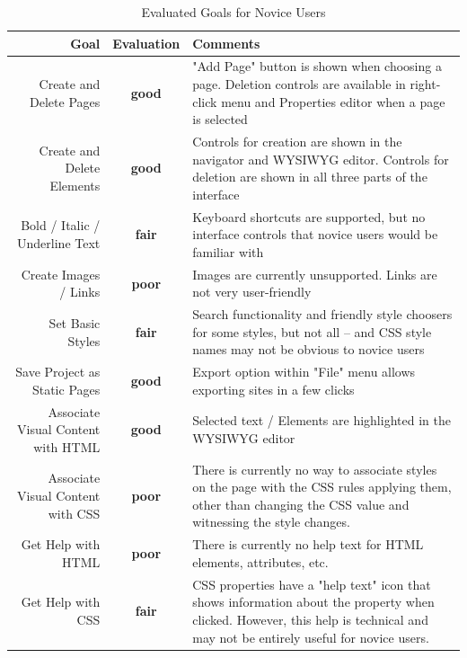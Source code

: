 \documentclass[conference, letterpaper]{IEEEtran}
\begin{document}
\begin{table}[!t]
\renewcommand{\arraystretch}{1.3}
\caption{Evaluated Goals for Novice Users}
\label{table:novice_goals}
\centering
\begin{tabular}{|r|c|p{8cm}|}
\hline
Goal & Evaluation & Comments \\
\hline \hline
Create and Delete Pages & \textbf{\color{ForestGreen}good} & "Add Page" button is shown when choosing a page. Deletion controls are available in right-click menu and Properties editor when a page is selected \\
\hline
Create and Delete Elements & \textbf{\color{ForestGreen}good} & Controls for creation are shown in the navigator and WYSIWYG editor. Controls for deletion are shown in all three parts of the interface \\
\hline
Bold / Italic / Underline Text & \textbf{\color{Dandelion}fair} & Keyboard shortcuts are supported, but no interface controls that novice users would be familiar with \\
\hline
Create Images / Links & \textbf{\color{Red}poor} & Images are currently unsupported. Links are not very user-friendly \\
\hline
Set Basic Styles & \textbf{\color{Dandelion}fair} & Search functionality and friendly style choosers for some styles, but not all -- and CSS style names may not be obvious to novice users \\
\hline
Save Project as Static Pages & \textbf{\color{ForestGreen}good} & Export option within "File" menu allows exporting sites in a few clicks \\
\hline
Associate Visual Content with HTML & \textbf{\color{ForestGreen}good} & Selected text / Elements are highlighted in the WYSIWYG editor \\
\hline
Associate Visual Content with CSS & \textbf{\color{Red}poor} & There is currently no way to associate styles on the page with the CSS rules applying them, other than changing the CSS value and witnessing the style changes. \\
\hline
Get Help with HTML & \textbf{\color{Red}poor} & There is currently no help text for HTML elements, attributes, etc. \\
\hline
Get Help with CSS & \textbf{\color{Dandelion}fair} & CSS properties have a "help text" icon that shows information about the property when clicked. However, this help is technical and may not be entirely useful for novice users. \\
\hline
\end{tabular}
\end{table}
\end{document}
